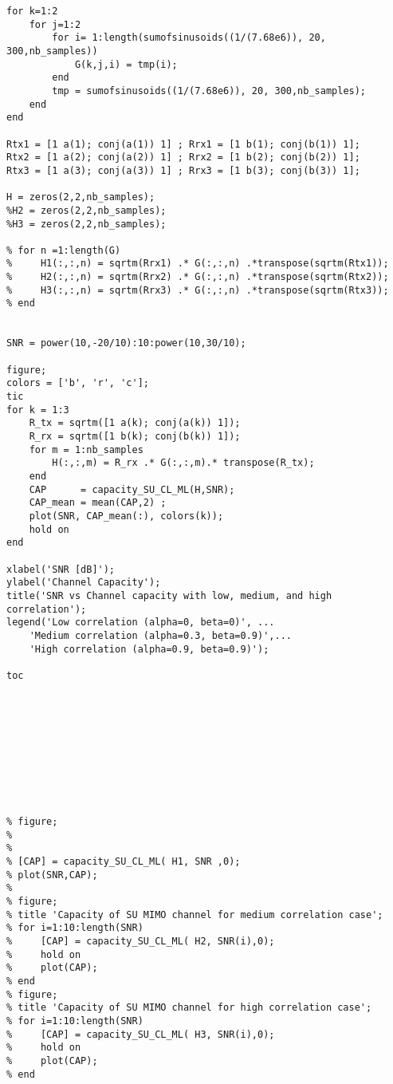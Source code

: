 \documentclass{article}
\begin{document}
\begin{lstlisting}
for k=1:2
    for j=1:2
        for i= 1:length(sumofsinusoids((1/(7.68e6)), 20, 300,nb_samples))
            G(k,j,i) = tmp(i);
        end
        tmp = sumofsinusoids((1/(7.68e6)), 20, 300,nb_samples);
    end
end

Rtx1 = [1 a(1); conj(a(1)) 1] ; Rrx1 = [1 b(1); conj(b(1)) 1];
Rtx2 = [1 a(2); conj(a(2)) 1] ; Rrx2 = [1 b(2); conj(b(2)) 1];
Rtx3 = [1 a(3); conj(a(3)) 1] ; Rrx3 = [1 b(3); conj(b(3)) 1];

H = zeros(2,2,nb_samples);
%H2 = zeros(2,2,nb_samples);
%H3 = zeros(2,2,nb_samples);

% for n =1:length(G)
%     H1(:,:,n) = sqrtm(Rrx1) .* G(:,:,n) .*transpose(sqrtm(Rtx1));
%     H2(:,:,n) = sqrtm(Rrx2) .* G(:,:,n) .*transpose(sqrtm(Rtx2));
%     H3(:,:,n) = sqrtm(Rrx3) .* G(:,:,n) .*transpose(sqrtm(Rtx3));
% end


SNR = power(10,-20/10):10:power(10,30/10);

figure; 
colors = ['b', 'r', 'c'];
tic
for k = 1:3
    R_tx = sqrtm([1 a(k); conj(a(k)) 1]);
    R_rx = sqrtm([1 b(k); conj(b(k)) 1]);
    for m = 1:nb_samples
        H(:,:,m) = R_rx .* G(:,:,m).* transpose(R_tx);
    end
    CAP      = capacity_SU_CL_ML(H,SNR);
    CAP_mean = mean(CAP,2) ;
    plot(SNR, CAP_mean(:), colors(k));
    hold on
end

xlabel('SNR [dB]');
ylabel('Channel Capacity');
title('SNR vs Channel capacity with low, medium, and high correlation');
legend('Low correlation (alpha=0, beta=0)', ...
    'Medium correlation (alpha=0.3, beta=0.9)',...
    'High correlation (alpha=0.9, beta=0.9)');
    
toc










% figure;
% 
% 
% [CAP] = capacity_SU_CL_ML( H1, SNR ,0);
% plot(SNR,CAP);
% 
% figure;
% title 'Capacity of SU MIMO channel for medium correlation case';
% for i=1:10:length(SNR)
%     [CAP] = capacity_SU_CL_ML( H2, SNR(i),0);
%     hold on
%     plot(CAP);
% end
% figure;
% title 'Capacity of SU MIMO channel for high correlation case';
% for i=1:10:length(SNR)
%     [CAP] = capacity_SU_CL_ML( H3, SNR(i),0);
%     hold on
%     plot(CAP);
% end






\end{lstlisting}
 
\end{document}
